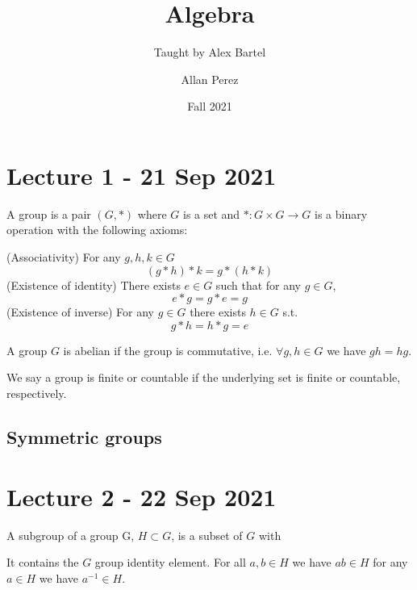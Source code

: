 \documentclass[11pt]{scrartcl}
\title{Algebra}
\subtitle{Taught by Alex Bartel}
\author{Allan Perez}
\date{Fall 2021}
\begin{document}
 \maketitle

\tableofcontents
\newpage

\section{Lecture 1 - 21 Sep 2021}

\begin{definition}
  A group is a pair $(G,*)$ where $G$ is a set and $*:G\times G\to G$ is a binary
  operation with the following axioms:
  \begin{itemize}
      \ii (Associativity) For any $g,h,k\in G$
      \[(g*h)*k = g*(h*k)\]
      \ii (Existence of identity) There exists $e\in G$ such that for any $g\in G$,
      \[e*g=g*e = g\]
      \ii (Existence of inverse) For any $g\in G$ there exists $h\in G$ s.t.
      \[g*h=h*g=e\]
  \end{itemize}
  \label{group}
\end{definition}

\begin{definition}
  A group $G$ is abelian if the group is commutative, i.e. $\forall g,h\in G$ we have
  $gh=hg$.
  \label{abelianGroup}
\end{definition}

\begin{definition}
  We say a group is finite or countable if the underlying set is finite or countable,
  respectively.
\end{definition}

\subsection{Symmetric groups}

\section{Lecture 2 - 22 Sep 2021}

\begin{definition}
   A subgroup of a group G, $H\subset G$, is a subset of $G$ with
   \begin{itemize}
       \ii It contains the $G$ group identity element.
       \ii For all $a,b\in H$ we have $ab\in H$
       \ii for any $a\in H$ we have $a^{-1}\in H$.
   \end{itemize}
   \label{subgroup}
 
\end{definition}
\end{document}
